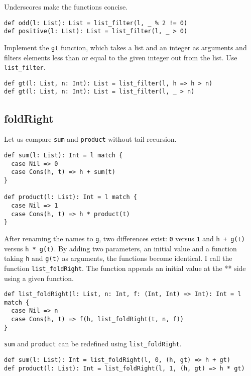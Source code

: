 Underscores make the functions concise.

\begin{verbatim}
def odd(l: List): List = list_filter(l, _ % 2 != 0)
def positive(l: List): List = list_filter(l, _ > 0)
\end{verbatim}

Implement the \verb!gt! function, which takes a list and an integer as arguments
and filters elements less than or equal to the given integer out from the list.
Use \verb!list_filter!.

\begin{verbatim}
def gt(l: List, n: Int): List = list_filter(l, h => h > n)
def gt(l: List, n: Int): List = list_filter(l, _ > n)
\end{verbatim}

\subsection{foldRight}

Let us compare \verb!sum! and \verb!product! without tail recursion.

\begin{verbatim}
def sum(l: List): Int = l match {
  case Nil => 0
  case Cons(h, t) => h + sum(t)
}

def product(l: List): Int = l match {
  case Nil => 1
  case Cons(h, t) => h * product(t)
}
\end{verbatim}

After renaming the names to \verb!g!, two differences exist: \verb!0! versus
\verb!1! and \verb!h + g(t)! versus \verb!h * g(t)!. By adding two parameters, an
initial value and a function taking \verb!h! and \verb!g(t)! as arguments, the
functions become identical. I call the function \verb!list_foldRight!. The
function appends an initial value at the ** side using a given function.

\begin{verbatim}
def list_foldRight(l: List, n: Int, f: (Int, Int) => Int): Int = l match {
  case Nil => n
  case Cons(h, t) => f(h, list_foldRight(t, n, f))
}
\end{verbatim}

\verb!sum! and \verb!product! can be redefined using \verb!list_foldRight!.

\begin{verbatim}
def sum(l: List): Int = list_foldRight(l, 0, (h, gt) => h + gt)
def product(l: List): Int = list_foldRight(l, 1, (h, gt) => h * gt)
\end{verbatim}

